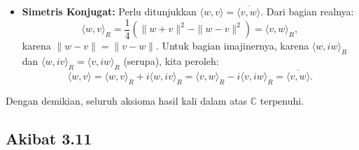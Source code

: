 \documentclass[aspectratio=169,11pt]{beamer}
\theoremstyle{definition}
\newcommand{\C}{\mathbb{C}}
\begin{document}
\begin{frame}[allowframebreaks]{\insertsection}{\insertsubsection}
\begin{itemize}
          Dengan demikian:
          \begin{align*}
            \langle iv, w \rangle & = \langle iv, w \rangle_R + i\langle iv, iw \rangle_R                                      \\
                                  & = -\langle v, iw \rangle_R + i\langle v, w \rangle_R                                       \\
                                  & = i\left(\langle v, w \rangle_R + i\langle v, iw \rangle_R\right) = i\langle v, w \rangle.
          \end{align*}
          Karena homogenitas riil dan perkalian $i$ keduanya terbukti, maka $\langle \alpha v, w \rangle = \alpha\langle v, w \rangle$ untuk semua $\alpha \in \C$.

    \item \textbf{Simetris Konjugat:} Perlu ditunjukkan $\langle w, v \rangle = \overline{\langle v, w \rangle}$. Dari bagian realnya:
          \begin{equation*}
            \langle w, v \rangle_R = \frac{1}{4}\left(\|w+v\|^2 - \|w-v\|^2\right) = \langle v, w \rangle_R,
          \end{equation*}
          karena $\|w-v\| = \|v-w\|$. Untuk bagian imajinernya, karena $\langle w, iw \rangle_R$ dan $\langle w,iv \rangle_R = \langle v, iw \rangle_R$ (serupa), kita peroleh:
          \begin{equation*}
            \langle w, v \rangle = \langle w, v \rangle_R + i\langle w, iv \rangle_R = \langle v, w \rangle_R - i\langle v, iw \rangle_R = \overline{\langle v, w \rangle}.
          \end{equation*}
  \end{itemize}
  Dengan demikian, seluruh aksioma hasil kali dalam atas $\C$ terpenuhi.
\end{frame}

\subsection{Akibat 3.11}
\end{document}
